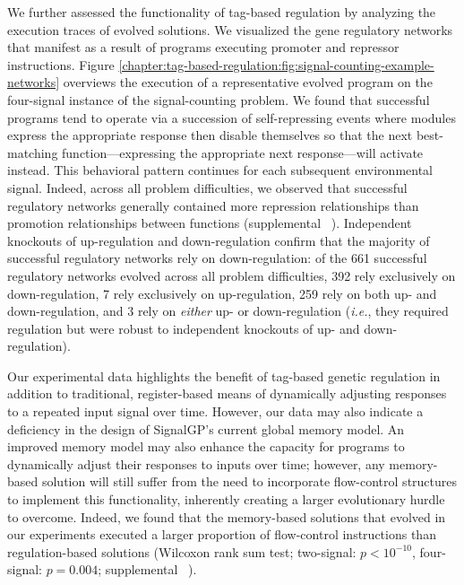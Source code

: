 

We further assessed the functionality of tag-based regulation by analyzing the execution traces of evolved solutions.
We visualized the gene regulatory networks that manifest as a result of programs executing promoter and repressor instructions. 
Figure \ref{chapter:tag-based-regulation:fig:signal-counting-example-networks} overviews the execution of a representative evolved program on the four-signal instance of the signal-counting problem.
We found that successful programs tend to operate via a succession of self-repressing events where modules express the appropriate response then disable themselves so that the next best-matching function---expressing the appropriate next response---will activate instead.
This behavioral pattern continues for each subsequent environmental signal.
Indeed, across all problem difficulties, we observed that successful regulatory networks generally contained more repression relationships than promotion relationships between functions (supplemental \supSecRepeatedSigAnalysis\  \citep{tag_regulation_supplement_2021}).
Independent knockouts of up-regulation and down-regulation confirm that the majority of successful regulatory networks rely on down-regulation: 
of the 661 successful regulatory networks evolved across all problem difficulties, 392 rely exclusively on down-regulation, 7 rely exclusively on up-regulation, 259 rely on both up- and down-regulation, and 3 rely on \textit{either} up- or down-regulation (\textit{i.e.}, they required regulation but were robust to independent knockouts of up- and down-regulation). 

Our experimental data highlights the benefit of tag-based genetic regulation in addition to traditional, register-based means of dynamically adjusting responses to a repeated input signal over time. 
However, our data may also indicate a deficiency in the design of SignalGP's current global memory model.
An improved memory model may also enhance the capacity for programs to dynamically adjust their responses to inputs over time; however, any memory-based solution will still suffer from the need to incorporate flow-control structures to implement this functionality, inherently creating a larger evolutionary hurdle to overcome.
Indeed, we found that the memory-based solutions that evolved in our experiments executed a larger proportion of flow-control instructions than regulation-based solutions
(Wilcoxon rank sum test; two-signal: $p < 10^{-10}$, four-signal: $p = 0.004$; supplemental \supSecRepeatedSigAnalysis\ \citep{tag_regulation_supplement_2021}).

